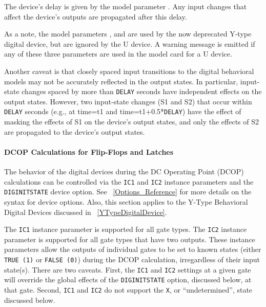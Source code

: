 The device's delay is given by the model parameter .  Any input changes
that affect the device's outputs are propagated after this delay.

As a note, the model parameters ,  and  are used
by the now deprecated Y-type digital device, but are
ignored by the U device.  A warning message is emitted if any of these three parameters
are used in the model card for a U device.

Another caveat is that closely spaced input transitions to the \Xyce{} digital behavioral
models may not be accurately reflected in the output states.  In particular, input-state
changes spaced by more than \texttt{DELAY} seconds have independent effects on the output
states. However, two input-state changes (S1 and S2) that occur within \texttt{DELAY} seconds
(e.g., at time=t1 and time=t1+0.5*\texttt{DELAY}) have the effect of masking the effects
of S1 on the device's output states, and only the effects of S2 are propagated to the
device's output states.

\paragraph{DCOP Calculations for Flip-Flops and Latches}
The behavior of the digital devices during the DC Operating Point (DCOP) calculations
can be controlled via the \texttt{IC1} and \texttt{IC2} instance parameters and the
\texttt{DIGINITSTATE} device option.  See ~\ref{Options_Reference} for more details on the
syntax for device options.  Also, this section applies to the Y-Type Behavioral Digital Devices
discussed in ~\ref{YTypeDigitalDevice}.

The \texttt{IC1} instance parameter is supported for all gate types.  The \texttt{IC2}
instance parameter is supported for all gate types that have two outputs.  These instance
parameters allow the outputs of individual gates to be set to known states (either
\texttt{TRUE (1)} or \texttt{FALSE (0)}) during the DCOP calculation, irregardless of their 
input state(s).  There are two caveats.  First, the \texttt{IC1} and \texttt{IC2} settings 
at a given gate will override the global effects of the \texttt{DIGINITSTATE} option, 
discussed below, at that gate.  Second, \texttt{IC1} and \texttt{IC2} do not support the
\texttt{X}, or ``undetermined'', state discussed below.

